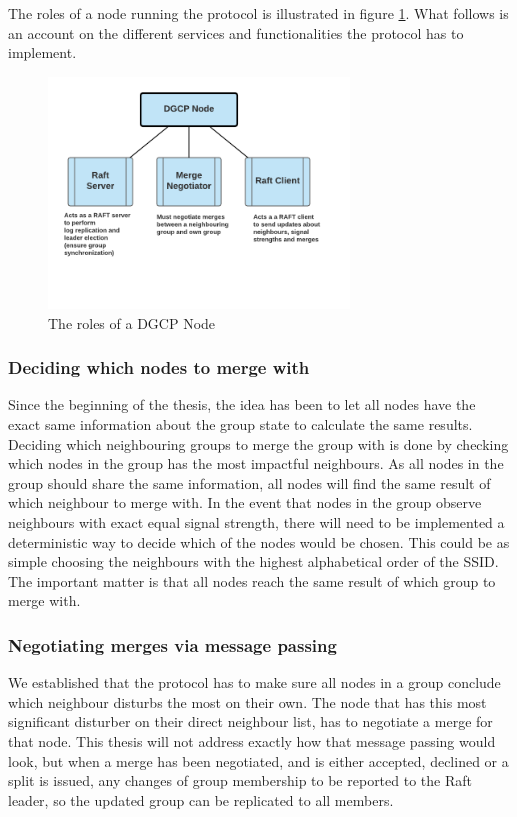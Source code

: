 The roles of a node running the protocol is illustrated in figure \ref{fig:dgcproles}. What follows is an account on the different services and functionalities the protocol
has to implement.  

\begin{figure}
	\centering
	\includegraphics[width=8cm]{Images/dgcpnode.png}
		\caption{The roles of a DGCP Node }%
		\label{fig:dgcproles}%
\end{figure}

\subsubsection{Deciding which nodes to merge with}
Since the beginning of the thesis, the idea has been to let all nodes have the exact same information about the group state to calculate the same results. Deciding
which neighbouring groups to merge the group with is done by checking which nodes in the group has the most impactful neighbours. As all nodes in the group should share
the same information, all nodes will find the same result of which neighbour to merge with.
In the event that nodes in the group observe neighbours with exact equal signal strength, there will need to be implemented a deterministic way to decide which of the nodes would be chosen.
This could be as simple choosing the neighbours with the highest alphabetical order of the SSID. The important matter is that all nodes reach the same result of which group to merge with. 

\subsubsection{Negotiating merges via message passing}
We established that the protocol has to make sure all nodes in a group conclude which neighbour disturbs the most on their own.
The node that has this most significant disturber on their direct neighbour list, has to negotiate a merge for that node. 
This thesis will not address exactly how that message passing would look, but when a merge has been negotiated, and is either accepted, declined or a split is issued,
any changes of group membership to be reported to the Raft leader, so the updated group can be replicated to all members. 

